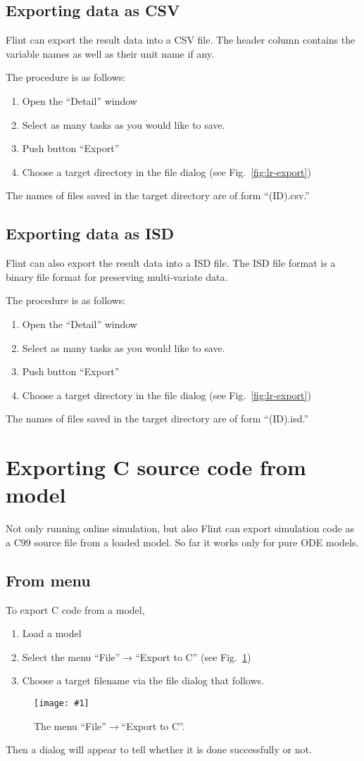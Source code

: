 \documentclass[a4paper,10pt]{report}
\newcommand\FigureOfImage[2]{\begin{figure}[h]
  \centering
  \texttt{[image: \#1]}
  \caption{#2}\label{fig:#1}
\end{figure}}
\begin{document}
\subsection{Exporting data as CSV}
Flint can export the result data into a CSV file.
The header column contains the variable names as well as their unit name if any.

The procedure is as follows:
\begin{enumerate}
\item Open the ``Detail'' window
\item Select as many tasks as you would like to save.
\item Push button ``Export''
\item Choose a target directory in the file dialog (see Fig.~\ref{fig:lr-export})
\end{enumerate}
The names of files saved in the target directory are of form ``(ID).csv.''

\subsection{Exporting data as ISD}
Flint can also export the result data into a ISD file.
The ISD file format is a binary file format for preserving multi-variate data.

The procedure is as follows:
\begin{enumerate}
\item Open the ``Detail'' window
\item Select as many tasks as you would like to save.
\item Push button ``Export''
\item Choose a target directory in the file dialog (see Fig.~\ref{fig:lr-export})
\end{enumerate}
The names of files saved in the target directory are of form ``(ID).isd.''

\section{Exporting C source code from model}
Not only running online simulation, but also Flint can export simulation code
as a C99 source file from a loaded model. So far it works only for pure ODE models.

\subsection{From menu}
To export C code from a model,
\begin{enumerate}
\item Load a model
\item Select the menu ``File''$\rightarrow$``Export to C'' (see Fig.~\ref{fig:export-to-c})
\item Choose a target filename via the file dialog that follows.
\end{enumerate}
\FigureOfImage{export-to-c}{The menu ``File''$\rightarrow$``Export to C''.}
Then a dialog will appear to tell whether it is done successfully or not.
\end{document}
